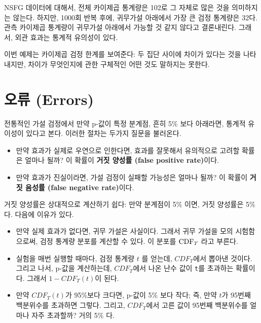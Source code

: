 NSFG 데이터에 대해서, 전체 카이제곱 통계량은 102로 그 자체로 많은 것을 의미하지는 않는다. 하지만, 1000회 반복 후에, 귀무가설 아래에서 가장 큰 검정 통계량은 32다. 관측 카이제곱 통계량이 귀무가설 아래에서 가능할 것 같지 않다고 결론내린다. 그래서, 외관 효과는 통계적 유의성이 있다.


이번 예제는 카이제곱 검정 한계를 보여준다: 두 집단 사이에 차이가 있다는 것을 나타내지만, 차이가 무엇인지에 관한 구체적인 어떤 것도 말하지는 못한다.

\section{오류 (Errors)}

전통적인 가설 검정에서 만약 p-값이 특정 분계점, 흔히 5\% 보다 아래라면, 통계적 유이성이 있다고 본다. 이러한 절차는 두가지 질문을 불러온다.

\begin{itemize}

\item 만약 효과가 실제로 우연으로 인한다면, 효과를 잘못해서 유의적으로 고려할 확률은 얼마나 될까? 이 확률이 {\bf 거짓 양성률 (false positive rate)}이다.

\item 만약 효과가 진실이라면, 가설 검정이 실패할 가능성은 얼마나 될까?
이 확률이 {\bf 거짓 음성률 (false negative rate)}이다.

\end{itemize}

거짓 양성률은 상대적으로 계산하기 쉽다: 만약 분계점이 5\% 이면, 거짓 양성률은 5\% 다. 다음에 이유가 있다.

\begin{itemize}

\item 만약 실제 효과가 없다면, 귀무 가설은 사실이다. 그래서 귀무 가설을 모의 시험함으로써, 검정 통계량 분포를 계산할 수 있다. 이 분포를 $\mathrm{CDF}_T$ 라고 부른다.

\item 실험을 매번 실행할 때마다, 검정 통계량 $t$ 를 얻는데, $CDF_T$에서 뽑아낸 것이다. 그리고 나서, p-값을 계산하는데, $CDF_T$에서 나온 난수 값이 {\tt t}를 초과하는 확률이다. 그래서 $1 - CDF_T(t)$이 된다.

\item 만약 $CDF_T(t)$가 95\%보다 크다면, p-값이 5\% 보다 작다; 즉, 만약 $t$가 95번째 백분위수를 초과하면 그렇다. 그리고, $CDF_T$에서 고른 값이 95번째 백분위수를 얼마나 자주 초과할까? 거의 5\% 다.

\end{itemize}

